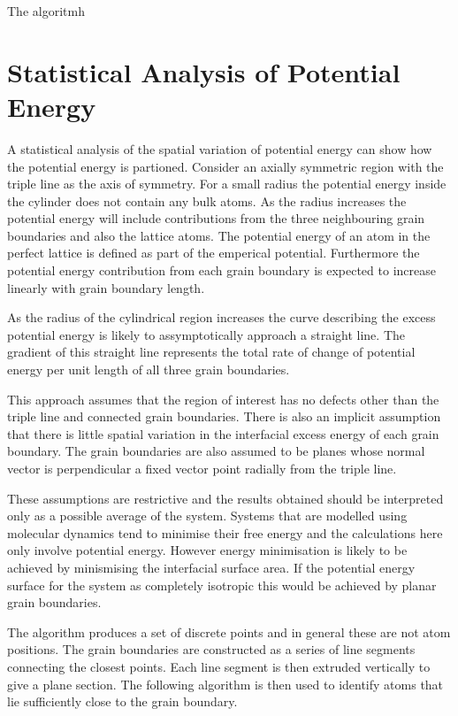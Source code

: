 \documentclass[12pt,a4paper]{book}
\begin{document}
The algoritmh 

\section{Statistical Analysis of Potential Energy}

A statistical analysis of the spatial variation of potential energy can show how the potential energy is partioned. Consider an axially symmetric region with the triple line as the axis of symmetry. For a small radius the potential energy inside the cylinder does not contain any bulk atoms. As the radius increases the potential energy will include contributions from the three neighbouring grain boundaries and also the lattice atoms. The potential energy of an atom in the perfect lattice is defined as part of the emperical potential. Furthermore the potential energy contribution from each grain boundary is expected to increase linearly with grain boundary length. 

As the radius of the cylindrical region increases the curve describing the excess potential energy is likely to assymptotically approach a straight line. The gradient of this straight line represents the total rate of change of potential energy per unit length of all three grain boundaries. 

This approach assumes that the region of interest has no defects other than the triple line and connected grain boundaries. There is also an implicit assumption that there is little spatial variation in the interfacial excess energy of each grain boundary. The grain boundaries are also assumed to be planes whose normal vector is perpendicular a fixed vector point radially from the triple line.

These assumptions are restrictive and the results obtained should be interpreted only as a possible average of the system. Systems that are modelled using molecular dynamics tend to minimise their free energy and the calculations here only involve potential energy. However energy minimisation is likely to be achieved by minismising the interfacial surface area. If the potential energy surface for the system as completely isotropic this would be achieved by planar grain boundaries.    

The algorithm produces a set of discrete points and in general these are not atom positions. The grain boundaries are constructed as a series of line segments connecting the closest points. Each line segment is then extruded vertically to give a plane section. The following algorithm is then used to identify atoms that lie sufficiently close to the grain boundary.
\end{document}
